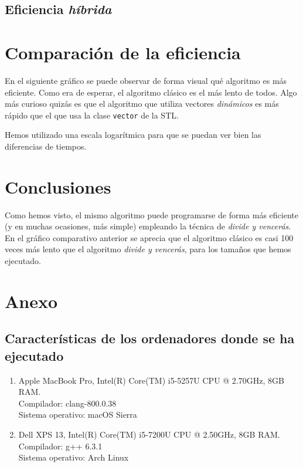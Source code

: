 \documentclass[11pt]{article}
\begin{document}
\begin{center}
	
\end{center}

\subsection*{Eficiencia \textit{híbrida}}

\section*{Comparación de la eficiencia}

En el siguiente gráfico se puede observar de forma visual qué algoritmo es más
eficiente. Como era de esperar, el algoritmo clásico es el más lento de
todos. Algo más curioso quizás es que el algoritmo que utiliza vectores
\textit{dinámicos} es más rápido que el que usa la clase \texttt{vector} de la STL.

\begin{center}
	
\end{center}

Hemos utilizado una escala logarítmica para que se puedan ver bien las diferencias de tiempos.

\section*{Conclusiones}

Como hemos visto, el mismo algoritmo puede programarse de forma más eficiente (y en muchas ocasiones, más simple) empleando la técnica de \textit{divide y vencerás}. En el gráfico comparativo anterior se aprecia que el algoritmo clásico es casi 100 veces más lento que el algoritmo \textit{divide y vencerás}, para los tamaños que hemos ejecutado.

\newpage

\section*{Anexo}
\subsection*{Características de los ordenadores donde se ha ejecutado}

\vspace{0.5em}

\begin{enumerate}
\item Apple MacBook Pro, Intel(R) Core(TM) i5-5257U CPU @ 2.70GHz, 8GB RAM.\\  Compilador: clang-800.0.38 \\
  Sistema operativo: macOS Sierra
\item Dell XPS 13, Intel(R) Core(TM) i5-7200U CPU @ 2.50GHz, 8GB RAM.\\
  Compilador: g++ 6.3.1\\
  Sistema operativo: Arch Linux
\end{enumerate}
\end{document}
